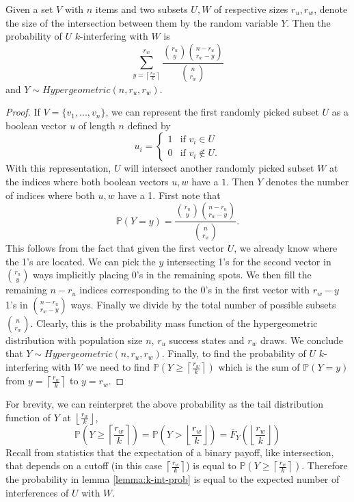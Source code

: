 \begin{lemma}
    \label{lemma:k-int-prob}
	Given a set $V$ with $n$ items and two subsets $U,W$ of respective sizes $r_u,r_w$, denote the size of the intersection between them by the random variable $Y$. Then the probability of $U$ $k$-interfering with $W$ is $$\sum_{y = \left\lceil \frac{r_w}{k} \right\rceil}^{r_w} \frac{\binom{r_u}{y} \binom{n-r_u}{r_w-y}}{\binom{n}{r_w}}$$ and $Y \sim Hypergeometric(n, r_u, r_w)$.
\end{lemma}
\begin{proof}
	If $V = \{v_1,...,v_n\}$, we can represent the first randomly picked subset $U$ as a boolean vector $u$ of length $n$ defined by
    $$
    u_i = \begin{cases}
        1 & \text{if } v_i \in U \\
        0 & \text{if } v_i \notin U.
    \end{cases}
    $$
    With this representation, $U$ will intersect another randomly picked subset $W$ at the indices where both boolean vectors $u, w$ have a $1$. Then $Y$ denotes the number of indices where both $u, w$ have a 1. First note that
    \begin{equation}
        \mathbb{P}(Y=y) = \frac{\binom{r_u}{y} \binom{n-r_u}{r_w-y}}{\binom{n}{r_w}}.
    \end{equation}
    This follows from the fact that given the first vector $U$, we already know where the 1's are located. We can pick the $y$ intersecting 1's for the second vector in $\binom{r_u}{y}$ ways implicitly placing 0's in the remaining spots. We then fill the remaining $n-r_u$ indices corresponding to the 0's in the first vector with $r_w-y$ 1's in $\binom{n-r_u}{r_w-y}$ ways. Finally we divide by the total number of possible subsets $\binom{n}{r_w}$. Clearly, this is the probability mass function of the hypergeometric distribution with population size $n$, $r_u$ success states and $r_w$ draws. We conclude that $Y \sim Hypergeometric(n, r_u, r_w)$. Finally, to find the probability of $U$ $k$-interfering with $W$ we need to find $\mathbb{P}(Y \ge \left\lceil \frac{r_w}{k} \right\rceil)$ which is the sum of $\mathbb{P}(Y=y)$ from $y = \left\lceil \frac{r_w}{k} \right\rceil$ to $y = r_w$.
\end{proof}

For brevity, we can reinterpret the above probability as the tail distribution function of $Y$ at $\left\lfloor \frac{r_w}{k} \right\rfloor$, 
$$
\mathbb{P}\left(Y \geq \left\lceil \frac{r_w}{k} \right\rceil\right) = \mathbb{P}\left(Y > \left\lfloor \frac{r_w}{k} \right\rfloor\right) = \bar{F}_Y\left(\left\lfloor \frac{r_w}{k} \right\rfloor\right)
$$
Recall from statistics that the expectation of a binary payoff, like intersection, that depends on a cutoff (in this case $\left\lceil \frac{r_w}{k} \right\rceil$) is equal to $\mathbb{P}\left(Y \geq \left\lceil \frac{r_w}{k} \right\rceil\right)$. Therefore the probability in lemma \ref{lemma:k-int-prob} is equal to the expected number of interferences of $U$ with $W$. 

